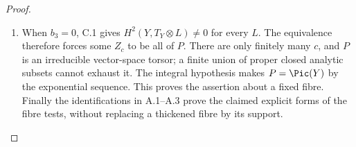 \begin{proof}
\begin{enumerate}[label={$\langle1\rangle$\arabic*.},leftmargin=*]
\item When $b_3=0$, C.1 gives $H^2(Y,T_Y\otimes L)\ne0$ for every $L$. The equivalence therefore forces some $Z_c$ to be all of $P$. There are only finitely many $c$, and $P$ is an irreducible vector-space torsor; a finite union of proper closed analytic subsets cannot exhaust it. The integral hypothesis makes $P=\Pic(Y)$ by the exponential sequence. This proves the assertion about a fixed fibre. Finally the identifications in A.1--A.3 prove the claimed explicit forms of the fibre tests, without replacing a thickened fibre by its support.

\end{enumerate}
\end{proof}
